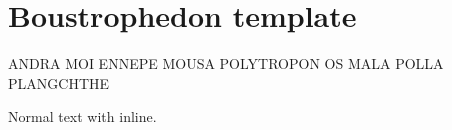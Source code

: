 \documentclass[12pt]{article}
\begin{document}
\section*{Boustrophedon template}


\bigskip

\startBoustrophedon[Type=Archaic]
ANDRA MOI ENNEPE MOUSA POLYTROPON OS MALA POLLA PLANGCHTHE
\stopBoustrophedon

\bigskip

Normal text with  inline.
\end{document}
